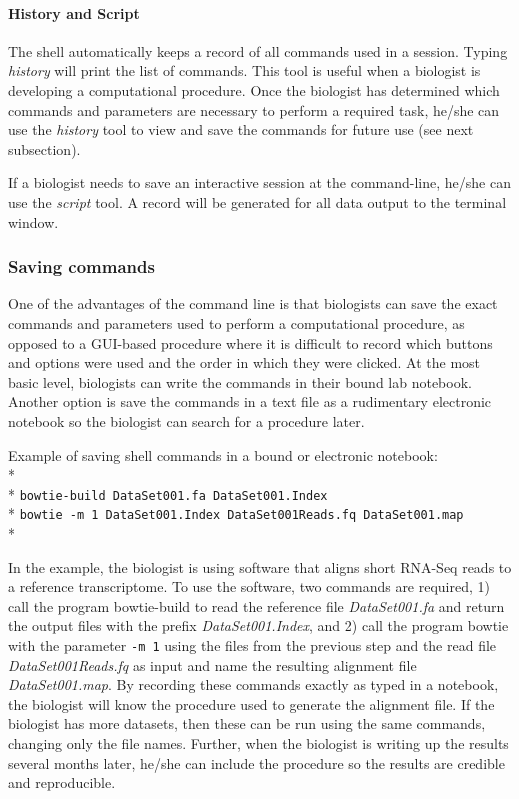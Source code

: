 \documentclass[ChapterTOCs,krantz2]{krantz} %
\begin{document}
\paragraph{History and Script}

The shell automatically keeps a record of all commands used 
in a session.  Typing \emph{history} will print the list of commands.  
This tool is useful when a biologist is developing a computational procedure.  
Once the biologist has determined which commands and parameters 
are necessary to perform a required 
task, he/she can use the \emph{history} tool to view and save the commands for 
future use (see next subsection).

If a biologist needs to save an interactive session at the command-line, 
he/she can use the \emph{script} tool.  A record will be generated 
for all data output to the terminal window.

\subsubsection{Saving commands}

One of the advantages of the command line is
that biologists can save the exact commands and parameters used to perform a
computational procedure, as opposed to a GUI-based procedure where it is
difficult to record which buttons and options were used and the order in which
they were clicked.  At the most basic level, biologists can write the commands
in their bound lab notebook.  Another option is save the commands in a text
file as a rudimentary electronic notebook so the biologist can search for a
procedure later.   

Example of saving shell commands in a bound or electronic notebook:\\* \\*
\texttt{bowtie-build DataSet001.fa DataSet001.Index}\\*
\texttt{bowtie -m 1 DataSet001.Index DataSet001Reads.fq DataSet001.map }\\*

In the example, the biologist is using software that aligns short RNA-Seq reads
to a reference transcriptome.  To use the software, two commands are required,
1) call the program bowtie-build to read the reference file
\emph{DataSet001.fa} and
return the output files with the prefix \emph{DataSet001.Index},
and 2) call the program bowtie with the parameter \texttt{-m 1} using the files from the
previous step and the read file \emph{DataSet001Reads.fq} as input and name the
resulting alignment file \emph{DataSet001.map}.  By recording these commands exactly
as typed in a notebook, the biologist will know the procedure used to generate
the alignment file.  If the biologist has more datasets, then these can be run
using the same commands, changing only the file names.  Further, when the
biologist is writing up the results several months later, he/she can include
the procedure so the results are credible and reproducible.
\end{document}
